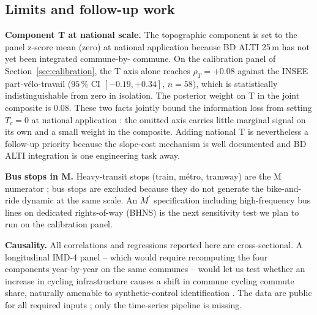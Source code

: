 \documentclass[11pt,a4paper]{article}
\begin{document}
\subsection{Limits and follow-up work}

\textbf{Component T at national scale.}  The topographic component
is set to the panel z-score mean (zero) at national application
because BD ALTI 25\,m has not yet been integrated commune-by-
commune.  On the calibration panel of
Section~\ref{sec:calibration}, the T axis alone reaches
$\rho_{T} = +0.08$ against the INSEE part-v\'elo-travail
($95\,\%$ CI $[-0.19, +0.34]$, $n = 58$), which is statistically
indistinguishable from zero in isolation.  The posterior weight
on T in the joint composite is $0.08$.  These two facts jointly
bound the information loss from setting $T_c = 0$ at national
application : the omitted axis carries little marginal signal on
its own and a small weight in the composite.  Adding national T
is nevertheless a follow-up priority because the slope-cost
mechanism is well documented \citep{Parkin2008,Rietveld2004}
and BD ALTI integration is one engineering task away.

\textbf{Bus stops in M.}  Heavy-transit stops (train, m\'etro,
tramway) are the M numerator ; bus stops are excluded because they
do not generate the bike-and-ride dynamic at the same scale.  An
$M^{\prime}$ specification including high-frequency bus lines on
dedicated rights-of-way (BHNS) is the next sensitivity test we
plan to run on the calibration panel.

\textbf{Causality.}  All correlations and regressions reported here
are cross-sectional.  A longitudinal IMD-4 panel -- which would
require recomputing the four components year-by-year on the same
communes -- would let us test whether an increase in cycling
infrastructure causes a shift in commune cycling commute share,
naturally amenable to synthetic-control identification
\citep{Abadie2010,Abadie2021}.  The data are public for all
required inputs ; only the time-series pipeline is missing.
\end{document}
